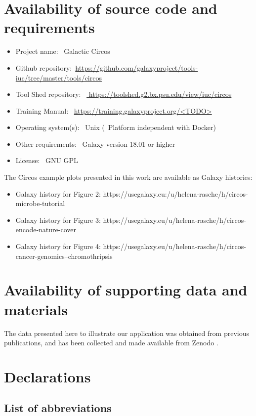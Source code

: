 \section*{Availability of source code and requirements}
\begin{itemize}
\item Project name: ~Galactic Circos
\item Github repository:~\url{https://github.com/galaxyproject/tools-iuc/tree/master/tools/circos}
\item Tool Shed repository: ~\url{ https://toolshed.g2.bx.psu.edu/view/iuc/circos}
\item Training Manual: ~\url{https://training.galaxyproject.org/<TODO>}
\item Operating system(s): ~Unix (~Platform independent with Docker)
\item Other requirements: ~Galaxy version 18.01 or higher
\item License: ~GNU GPL
\end{itemize}

The Circos example plots presented in this work are available as Galaxy histories:

\begin{itemize}
\item Galaxy history for Figure 2: https://usegalaxy.eu:/u/helena-rasche/h/circos-microbe-tutorial
\item Galaxy history for Figure 3: https://usegalaxy.eu/u/helena-rasche/h/circos-encode-nature-cover
\item Galaxy history for Figure 4: https://usegalaxy.eu/u/helena-rasche/h/circos-cancer-genomics--chromothripsis
\end{itemize}

\section*{Availability of supporting data and materials}

The data presented here to illustrate our application was obtained from previous publications, and has been collected and made available from Zenodo \cite{TODO}.

\section*{Declarations}

\subsection*{List of abbreviations}

